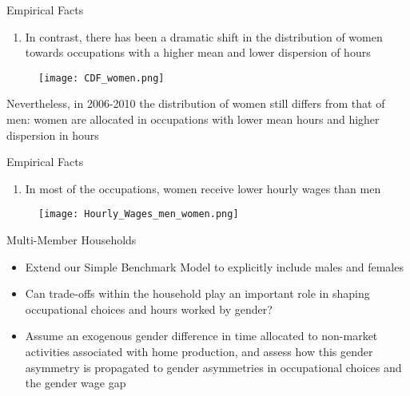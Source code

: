 \documentclass[hyperref={bookmarks=false}]{beamer}
\newcounter{ResumeEnumerate}
\begin{document}
\begin{frame}{Empirical Facts}
\begin{enumerate}[start=\numexpr\value{ResumeEnumerate}+1]
\item In contrast, there has been a dramatic shift in the distribution of women towards occupations with a higher mean and lower dispersion of hours
\end{enumerate}
\begin{figure}[!t]
\centering
\begin{minipage}[b]{0.9\textwidth}{}
\centering
\texttt{[image: CDF\_women.png]}
\end{minipage}
\end{figure}
Nevertheless, in 2006-2010 the distribution of women still differs from that of men: women are allocated in occupations with lower mean hours and higher dispersion in hours
\setcounter{ResumeEnumerate}{\value{enumi}}
\end{frame}

\begin{frame}{Empirical Facts}
\begin{enumerate}[start=\numexpr\value{ResumeEnumerate}+1]
\item In most of the occupations, women receive lower hourly wages than men
\end{enumerate}
\begin{figure}[!t]
\centering
\begin{minipage}[b]{0.6\textwidth}{}
\centering
\texttt{[image: Hourly\_Wages\_men\_women.png]}
\end{minipage}
\end{figure}
\setcounter{ResumeEnumerate}{\value{enumi}}
\end{frame}

\begin{frame}{Multi-Member Households}
\begin{itemize}
\setlength{\itemsep}{0.35 cm}
\item Extend our Simple Benchmark Model to explicitly include males and females
\item Can trade-offs within the household play an important role in shaping occupational choices and hours worked by gender?
\item Assume an exogenous gender difference in time allocated to non-market activities associated with home production, and assess how this gender asymmetry is propagated to gender asymmetries in occupational choices and the gender wage gap
\end{itemize}
\end{frame}
\end{document}
